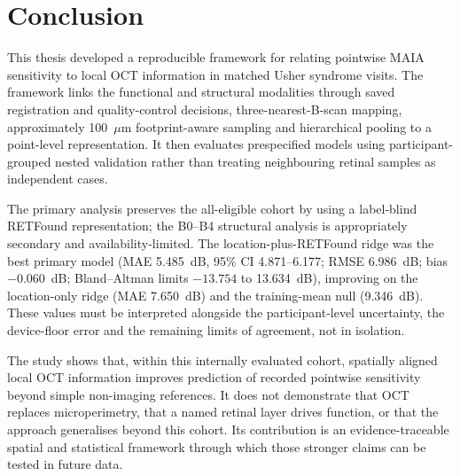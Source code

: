 \chapter{Conclusion}
\label{chap:conclusion}

This thesis developed a reproducible framework for relating pointwise MAIA sensitivity to local OCT information in matched Usher syndrome visits. The framework links the functional and structural modalities through saved registration and quality-control decisions, three-nearest-B-scan mapping, approximately 100~$\mu$m footprint-aware sampling and hierarchical pooling to a point-level representation. It then evaluates prespecified models using participant-grouped nested validation rather than treating neighbouring retinal samples as independent cases.

The primary analysis preserves the all-eligible cohort by using a label-blind RETFound representation; the B0--B4 structural analysis is appropriately secondary and availability-limited. The location-plus-RETFound ridge was the best primary model (MAE 5.485~dB, 95\% CI 4.871--6.177; RMSE 6.986~dB; bias $-0.060$~dB; Bland--Altman limits $-13.754$ to 13.634~dB), improving on the location-only ridge (MAE 7.650~dB) and the training-mean null (9.346~dB). These values must be interpreted alongside the participant-level uncertainty, the device-floor error and the remaining limits of agreement, not in isolation.

The study shows that, within this internally evaluated cohort, spatially aligned local OCT information improves prediction of recorded pointwise sensitivity beyond simple non-imaging references. It does not demonstrate that OCT replaces microperimetry, that a named retinal layer drives function, or that the approach generalises beyond this cohort. Its contribution is an evidence-traceable spatial and statistical framework through which those stronger claims can be tested in future data.
